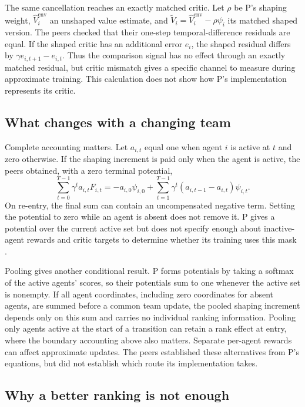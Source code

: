 \documentclass{article}
\begin{document}
The same cancellation reaches an exactly matched critic. Let \(\rho\) be P's shaping weight, \(\widehat
V_i^{\mathrm{env}}\) an unshaped value estimate, and \(\widetilde V_i=\widehat V_i^{\mathrm{env}}-\rho\psi_i\)
its matched shaped version. The peers checked that their one-step temporal-difference residuals are equal. If
the shaped critic has an additional error \(e_i\), the shaped residual differs by \(\gamma
e_{i,t+1}-e_{i,t}\). Thus the comparison signal has no effect through an exactly matched residual, but critic
mismatch gives a specific channel to measure during approximate training. This calculation does not show how
P's implementation represents its critic.

\subsection{What changes with a changing team}

Complete accounting matters. Let \(a_{i,t}\) equal one when agent \(i\) is active at \(t\) and zero otherwise.
If the shaping increment is paid only when the agent is active, the peers obtained, with a zero terminal
potential,
\[
\sum_{t=0}^{T-1}\gamma^t a_{i,t}F_{i,t}
=-a_{i,0}\psi_{i,0}
+\sum_{t=1}^{T-1}\gamma^t(a_{i,t-1}-a_{i,t})\psi_{i,t}.
\]
On re-entry, the final sum can contain an uncompensated negative term. Setting the potential to zero while an
agent is absent does not remove it. P gives a potential over the current active set but does not specify
enough about inactive-agent rewards and critic targets to determine whether its training uses this mask
\cite{P}.

Pooling gives another conditional result. P forms potentials by taking a softmax of the active agents' scores,
so their potentials sum to one whenever the active set is nonempty. If all agent coordinates, including zero
coordinates for absent agents, are summed before a common team update, the pooled shaping increment depends
only on this sum and carries no individual ranking information. Pooling only agents active at the start of a
transition can retain a rank effect at entry, where the boundary accounting above also matters. Separate
per-agent rewards can affect approximate updates. The peers established these alternatives from P's equations,
but did not establish which route its implementation takes.

\subsection{Why a better ranking is not enough}
\end{document}
